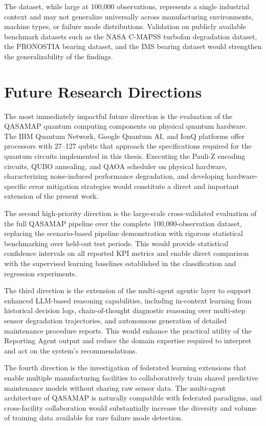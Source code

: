The dataset, while large at 100,000 observations, represents a single industrial context and may not generalize universally across manufacturing environments, machine types, or failure mode distributions. Validation on publicly available benchmark datasets such as the NASA C-MAPSS turbofan degradation dataset, the PRONOSTIA bearing dataset, and the IMS bearing dataset would strengthen the generalizability of the findings.

\section{Future Research Directions}

The most immediately impactful future direction is the evaluation of the QASAMAP quantum computing components on physical quantum hardware. The IBM Quantum Network, Google Quantum AI, and IonQ platforms offer processors with 27--127 qubits that approach the specifications required for the quantum circuits implemented in this thesis. Executing the Pauli-Z encoding circuits, QUBO annealing, and QAOA scheduler on physical hardware, characterizing noise-induced performance degradation, and developing hardware-specific error mitigation strategies would constitute a direct and important extension of the present work.

The second high-priority direction is the large-scale cross-validated evaluation of the full QASAMAP pipeline over the complete 100,000-observation dataset, replacing the scenario-based pipeline demonstration with rigorous statistical benchmarking over held-out test periods. This would provide statistical confidence intervals on all reported KPI metrics and enable direct comparison with the supervised learning baselines established in the classification and regression experiments.

The third direction is the extension of the multi-agent agentic layer to support enhanced LLM-based reasoning capabilities, including in-context learning from historical decision logs, chain-of-thought diagnostic reasoning over multi-step sensor degradation trajectories, and autonomous generation of detailed maintenance procedure reports. This would enhance the practical utility of the Reporting Agent output and reduce the domain expertise required to interpret and act on the system's recommendations.

The fourth direction is the investigation of federated learning extensions that enable multiple manufacturing facilities to collaboratively train shared predictive maintenance models without sharing raw sensor data. The multi-agent architecture of QASAMAP is naturally compatible with federated paradigms, and cross-facility collaboration would substantially increase the diversity and volume of training data available for rare failure mode detection.

